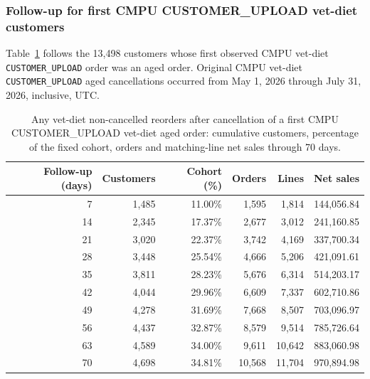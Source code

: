 \clearpage
\subsubsection{Follow-up for first CMPU CUSTOMER\_UPLOAD vet-diet customers}
Table~\ref{tab:financial-opportunity-new-upload-any-vet-diet} follows the
13,498 customers whose first observed CMPU vet-diet
\texttt{CUSTOMER\_UPLOAD} order was an aged order. Original CMPU vet-diet
\texttt{CUSTOMER\_UPLOAD} aged cancellations occurred from
May 1, 2026 through July 31, 2026, inclusive, UTC.

\begin{table}[!htbp]
\centering
\caption{Any vet-diet non-cancelled reorders after cancellation of a first CMPU CUSTOMER\_UPLOAD vet-diet aged order: cumulative customers, percentage of the fixed cohort, orders and matching-line net sales through 70 days.}
\label{tab:financial-opportunity-new-upload-any-vet-diet}
\begin{tabular}{@{}rrrrrr@{}}
\toprule
Follow-up (days) & Customers & Cohort (\%) & Orders & Lines & Net sales \\
\midrule
7 & 1,485 & 11.00\% & 1,595 & 1,814 & 144,056.84 \\
14 & 2,345 & 17.37\% & 2,677 & 3,012 & 241,160.85 \\
21 & 3,020 & 22.37\% & 3,742 & 4,169 & 337,700.34 \\
28 & 3,448 & 25.54\% & 4,666 & 5,206 & 421,091.61 \\
35 & 3,811 & 28.23\% & 5,676 & 6,314 & 514,203.17 \\
42 & 4,044 & 29.96\% & 6,609 & 7,337 & 602,710.86 \\
49 & 4,278 & 31.69\% & 7,668 & 8,507 & 703,096.97 \\
56 & 4,437 & 32.87\% & 8,579 & 9,514 & 785,726.64 \\
63 & 4,589 & 34.00\% & 9,611 & 10,642 & 883,060.98 \\
70 & 4,698 & 34.81\% & 10,568 & 11,704 & 970,894.98 \\
\bottomrule
\end{tabular}


\end{table}

